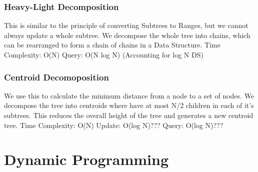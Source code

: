 \documentclass{article}
\begin{document}
\subsubsection{Heavy-Light Decomposition}
\begin{flushleft}
This is similar to the principle of converting Subtrees to Ranges, but
we cannot always update a whole subtree. We decompose the whole tree into chains,
which can be rearranged to form a chain of chains in a Data Structure.
\newline
Time Complexity: O(N)
\newline
Query: O(N log N) (Accounting for log N DS)
\end{flushleft}


\subsubsection{Centroid Decomoposition}
\begin{flushleft}
We use this to calculate the minimum distance from a node to a set of nodes.
We decompose the tree into centroids where have at most N/2 children in each of it's 
subtrees. This reduces the overall height of the tree and generates a new centroid tree.
\newline
Time Complexity: O(N)
\newline
Update: O(log N)???
\newline
Query: O(log N)???
\end{flushleft}


\section{Dynamic Programming}
\end{document}
